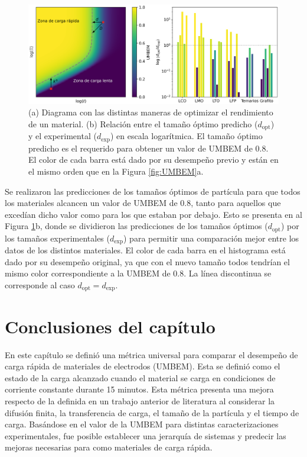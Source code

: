 \begin{figure}[h!]
    \centering
    \includegraphics[width=\textwidth]{FastCharging/umbem/sizes.png}
    \caption{(a) Diagrama con las distintas maneras de optimizar el rendimiento 
    de un material. (b) Relación entre el tamaño óptimo predicho 
    ($d_{\text{opt}}$) y el experimental ($d_{\text{exp}}$) en escala logarítmica.
    El tamaño óptimo predicho es el requerido para obtener un valor de UMBEM 
    de 0.8. El color de cada barra está dado por su desempeño previo y están en 
    el mismo orden que en la Figura \ref{fig:UMBEM}a.}
    \label{fig:sizes}
\end{figure}

Se realizaron las predicciones de los tamaños óptimos de partícula para que todos 
los materiales alcancen un valor de UMBEM de 0.8, tanto para aquellos que excedían 
dicho valor como para los que estaban por debajo. Esto se presenta en al Figura 
\ref{fig:sizes}b, donde se dividieron las predicciones de los tamaños óptimos 
($d_{\text{opt}}$) por los tamaños experimentales ($d_{\text{exp}}$) para permitir
una comparación mejor entre los datos de los distintos materiales. El color de 
cada barra en el histograma está dado por su desempeño original, ya que con 
el nuevo tamaño todos tendrían el mismo color correspondiente a la UMBEM de 0.8.
La línea discontinua se corresponde al caso $d_{\text{opt}} = d_{\text{exp}}$.

\section{Conclusiones del capítulo}

En este capítulo se definió una métrica universal para comparar el desempeño
de carga rápida de materiales de electrodos (UMBEM). Esta se definió como el estado de la carga 
alcanzado cuando el material se carga en condiciones de corriente constante 
durante 15 minutos. Esta métrica presenta una mejora respecto de la definida en un trabajo anterior de literatura al
considerar la difusión finita, la transferencia de carga, el tamaño de la 
partícula y el tiempo de carga. Basándose en el valor de la UMBEM para distintas 
caracterizaciones experimentales, fue posible establecer una jerarquía de 
sistemas y predecir las mejoras necesarias para  %
como materiales de carga rápida.
